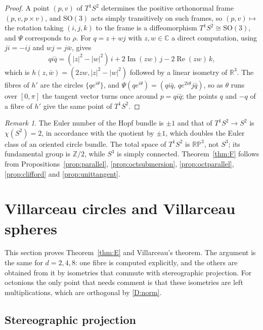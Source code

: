 \documentclass[11pt]{amsart}
\numberwithin{equation}{section}
\theoremstyle{plain}
\theoremstyle{definition}
\theoremstyle{remark}
\newtheorem{remark}[theorem]{Remark}
\newcommand{\R}{\mathbb{R}}
\newcommand{\C}{\mathbb{C}}
\newcommand{\Z}{\mathbb{Z}}
\newcommand{\SO}{\mathrm{SO}}
\newcommand{\RP}{\mathbb{RP}}
\newcommand{\Imag}{\operatorname{Im}}
\renewcommand{\Re}{\operatorname{Re}}
\begin{document}
\begin{proof}
A point $(p,v)$ of $T^1S^2$ determines the positive orthonormal frame $(p,v,p\times v)$, and $\SO(3)$ acts simply transitively on such frames, so $(p,v)\mapsto$ the rotation taking $(i,j,k)$ to the frame is a diffeomorphism $T^1S^2\cong\SO(3)$, and $\Psi$ corresponds to $\rho$. For $q=z+wj$ with $z,w\in\C$ a direct computation, using $ji=-ij$ and $wj=j\bar w$, gives
\[
qi\bar q=(|z|^2-|w|^2)\,i+2\Imag(zw)\,j-2\Re(zw)\,k,
\]
which is $h(z,\bar w)=(2zw,|z|^2-|w|^2)$ followed by a linear isometry of $\R^3$. The fibres of $h'$ are the circles $\{qe^{i\theta}\}$, and $\Psi(qe^{i\theta})=(qi\bar q,\,qe^{2i\theta}j\bar q)$, so as $\theta$ runs over $[0,\pi]$ the tangent vector turns once around $p=qi\bar q$; the points $q$ and $-q$ of a fibre of $h'$ give the same point of $T^1S^2$.
\end{proof}

\begin{remark}
The Euler number of the Hopf bundle is $\pm1$ and that of $T^1S^2\to S^2$ is $\chi(S^2)=2$, in accordance with the quotient by $\pm1$, which doubles the Euler class of an oriented circle bundle. The total space of $T^1S^2$ is $\RP^3$, not $S^3$; its fundamental group is $\Z/2$, while $S^3$ is simply connected. Theorem~\ref{thm:F} follows from Propositions~\ref{prop:parallel}, \ref{prop:octsubmersion}, \ref{prop:octparallel}, \ref{prop:clifford} and \ref{prop:unittangent}.
\end{remark}
\section{Villarceau circles and Villarceau spheres}\label{ch:villarceau}

This section proves Theorem~\ref{thm:E} and Villarceau's theorem. The argument is the same for $d=2,4,8$: one fibre is computed explicitly, and the others are obtained from it by isometries that commute with stereographic projection. For octonions the only point that needs comment is that these isometries are left multiplications, which are orthogonal by \ref{D:norm}.

\subsection{Stereographic projection}\label{sec:stereo}
\end{document}
